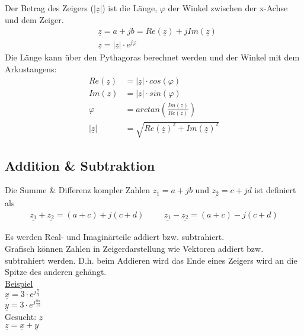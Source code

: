 Der Betrag des Zeigers ($|\underline{z}|$) ist die Länge, $\varphi$ der Winkel zwischen der x-Achse und dem Zeiger.
\begin{align}
    &\underline{z}=a+jb=Re(\underline{z})+j Im(\underline{z})   \\
    &\underline{z}=|\underline{z}|\cdot e^{j\varphi}
\end{align}
Die Länge kann über den Pythagoras berechnet werden und der Winkel mit dem Arkustangens:
\begin{align}
    Re(\underline{z})&=|\underline{z}|\cdot cos(\varphi)                \\
    Im(\underline{z})&=|\underline{z}|\cdot sin(\varphi)                \\
    \varphi&=arctan(\frac{Im(\underline{z})}{Re(\underline{z})})        \\
    |\underline{z}|&=\sqrt{Re(\underline{z})^{2}+Im(\underline{z})^{2}}
\end{align}

\newpage

\subsection{Addition \& Subtraktion}
Die Summe \& Differenz kompler Zahlen $\underline{z_1}=a+jb$ und $\underline{z_2}=c+jd$ ist definiert als
\begin{align}
    \underline{z_1} + \underline{z_2} = (a+c) + j(c+d) \hspace{1cm} \underline{z_1} - \underline{z_2} = (a+c) - j(c+d)
\end{align}

Es werden Real- und Imaginärteile addiert bzw. subtrahiert.\\

Grafisch können Zahlen in Zeigerdarstellung wie Vektoren addiert bzw. subtrahiert werden. D.h. beim Addieren wird das Ende eines Zeigers wird an die Spitze des anderen gehängt.\\

\underline{Beispiel} \\
$\underline{x}=3\cdot e^{j\frac{\pi}{3}}$ \\
$\underline{y}=3\cdot e^{j\frac{8\pi}{12}}$ \\

Gesucht: $\underline{z}$\\
$\underline{z}=\underline{x}+\underline{y}$

